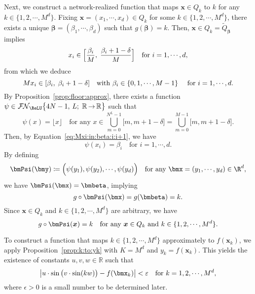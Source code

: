 \documentclass[11pt,a4paper]{article}
\begin{document}
Next, we construct a network-realized function that maps \(\bm{x}  \in Q_k\) to \(k\) for any \(k \in \{1, 2, \cdots, M^d\}\). Fixing \(\bm{x}= (x_1, \cdots, x_d) \in Q_k\) for some \(k \in \{1, 2, \cdots, M^d\}\), there exists a unique \(\bm{\beta} = (\beta_1, \cdots, \beta_d)\) such that \(g(\bm{\beta}) = k\). 
Then, \(\bm{x} \in Q_k = \tilde{Q}_{\bm{\beta}}\) implies
\begin{equation*}
    x_i \in \Big[\frac{\beta_i}{M},\; \frac{\beta_i + 1 - \delta}{M}\Big]\quad \textnormal{for } i = 1, \mathinner{\mkern-0.1mu\cdotp\mkern-0.3mu\cdotp\mkern-0.3mu\cdotp\mkern-0.1mu}, d,
\end{equation*}
from which we deduce
\begin{equation}\label{eq:Mxi:in:beta:i:i+1}
    Mx_i \in [\beta_i,\; \beta_i + 1 - \delta]  \quad \textnormal{with } \beta_i \in \{0, 1, \mathinner{\mkern-0.1mu\cdotp\mkern-0.3mu\cdotp\mkern-0.3mu\cdotp\mkern-0.1mu}, M-1\} \quad  \textnormal{ for } i = 1, \mathinner{\mkern-0.1mu\cdotp\mkern-0.3mu\cdotp\mkern-0.3mu\cdotp\mkern-0.1mu}, d.
\end{equation}
By Proposition~\ref{prop:floor:approx}, there exists a function \( {\psi}  \in \nn[\big]{\ReLU}{4N-1}{L}{\mathbb{R}}{\mathbb{R}}\) such that
\begin{equation*}
     {\psi} (x) = \lfloor x \rfloor \quad \text{for any } x \in \bigcup_{m=0}^{N^L - 1} \big[m, m + 1 - \delta\big] = \bigcup_{m=0}^{M - 1} \big[m, m + 1 - \delta\big].
\end{equation*}
Then, by Equation~\eqref{eq:Mxi:in:beta:i:i+1}, we have
\begin{equation*}
    {\psi}(x_i) = \beta_i \quad \text{for } i = 1,   \cdots, d.
\end{equation*}
By defining
\begin{equation*}
\bmPsi(\bmy)\coloneqq \Big(\psi(y_1),\psi(y_2),\cdots,\psi(y_d)\Big) \quad \tn{for any } \bmx=(y_1,\cdots,y_d) \in \R^d,
\end{equation*}
we have $\bmPsi(\bmx)=\bmbeta$, implying
\begin{equation*}
    g\circ \bmPsi(\bmx)=g(\bmbeta)=k.
\end{equation*}
Since \(\bm{x} \in Q_k\) and \(k \in \{1, 2, \cdots, M^d\}\) are arbitrary, we have
\begin{equation}\label{eq:g:tildePsi:x:to:k}
    g \circ \bmPsi(\bm{x}) = k \quad \tn{for any } \bm{x} \in Q_k \text{ and } k \in \{1, 2, \cdots, M^d\}.
\end{equation}

To construct a function that maps \( k \in \{1, 2, \cdots, M^d\} \) approximately to \( f(\bm{x}_k) \), we apply Proposition~\ref{prop:k:to:yk} with \( K = M^d \) and \( y_k = f(\bm{x}_k) \). This yields the existence of constants \( u, v, w \in \mathbb{R} \) such that
\begin{equation}
\label{eq:sinsin:approx:f(xk):eps}
    \left| u \cdot \sin\big(v \cdot \sin(k w)\big) - f(\bmx_k) \right| < \epsilon \quad \text{for } k = 1, 2, \cdots, M^d,
\end{equation}
where \( \epsilon > 0 \) is a small number to be determined later.
\end{document}
